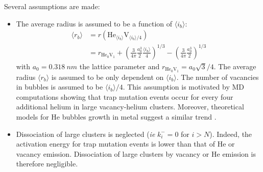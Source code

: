 Several assumptions are made:
\begin{itemize}
    \item The average radius is assumed to be a function of $\langle i_b \rangle$:
    \begin{equation}
        \begin{split}
            \langle r_b \rangle &= r(\mathrm{He}_{\langle i_b \rangle}\mathrm{V}_{\langle i_b \rangle/4}) \\
            &= r_{\mathrm{He}_0 \mathrm{V}_1} + \left(\frac{3}{4 \pi} \frac{a_0^3}{2} \frac{\langle i_b \rangle}{4} \right)^{1/3} - \left(\frac{3}{4 \pi} \frac{a_0^3}{2} \right)^{1/3}
        \end{split}
        \label{eq: radius average}
    \end{equation}
    with $a_0 = \SI{0.318}{nm}$ the lattice parameter and $r_{\mathrm{He}_0 \mathrm{V}_1} =  a_0 \sqrt{3}/4$.
    The average radius $\langle r_b \rangle$ is assumed to be only dependent on $\langle i_b \rangle$.
    The number of vacancies in bubbles is assumed to be $\langle i_b \rangle/4$.
    This assumption is motivated by MD computations showing that trap mutation events occur for every four additional helium in large vacancy-helium clusters.
    Moreover, theoretical models for He bubbles growth in metal suggest a similar trend .
    \item Dissociation of large clusters is neglected (\textit{ie} $k_i^- = 0$ for $i>N$).
    Indeed, the activation energy for trap mutation events is lower than that of He or vacancy emission. Dissociation of large clusters by vacancy or He emission is therefore negligible.
\end{itemize}

